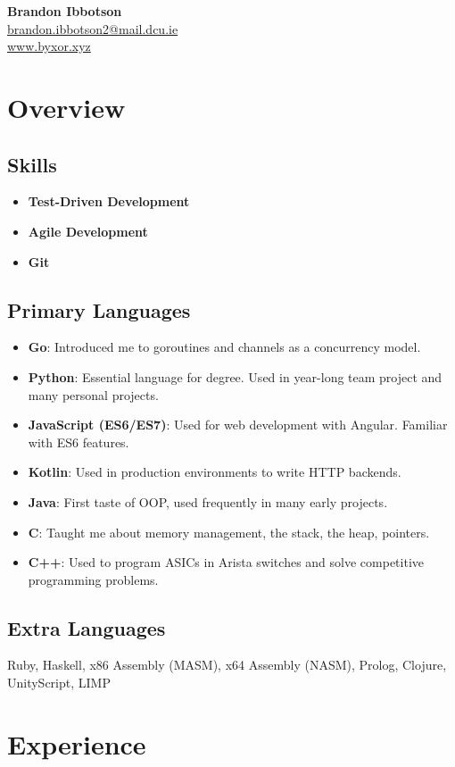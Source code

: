\documentclass{article}
\makeatletter
\newcommand{\youremail}[1]{\href{mailto:#1}{#1}}
\renewcommand{\maketitle}{
  \begin{center}
   { \huge \bfseries Brandon Ibbotson }\\
    \vspace{.5em}
   \youremail{ brandon.ibbotson2@mail.dcu.ie }\\
   \url{www.byxor.xyz}\\
    \vspace{.7em}
  \end{center}
}
\makeatother
\begin{document}
\maketitle
\section{Overview}
\subsection{Skills}
\begin{itemize}
\item \textbf{Test-Driven Development}
\item \textbf{Agile Development}
\item \textbf{Git}
\end{itemize}
\subsection{Primary Languages}
\begin{itemize}
\item \textbf{Go}: Introduced me to goroutines and channels as a concurrency model.
\item \textbf{Python}: Essential language for degree. Used in year-long team project and many personal projects.
\item \textbf{JavaScript (ES6/ES7)}: Used for web development with Angular. Familiar with ES6 features.
\item \textbf{Kotlin}: Used in production environments to write HTTP backends.
\item \textbf{Java}: First taste of OOP, used frequently in many early projects.
\item \textbf{C}: Taught me about memory management, the stack, the heap, pointers.
\item \textbf{C++}: Used to program ASICs in Arista switches and solve competitive programming problems.
\end{itemize}
\subsection{Extra Languages}
Ruby, Haskell, x86 Assembly (MASM), x64 Assembly (NASM), Prolog, Clojure, UnityScript, LIMP
\section{Experience}
\end{document}
